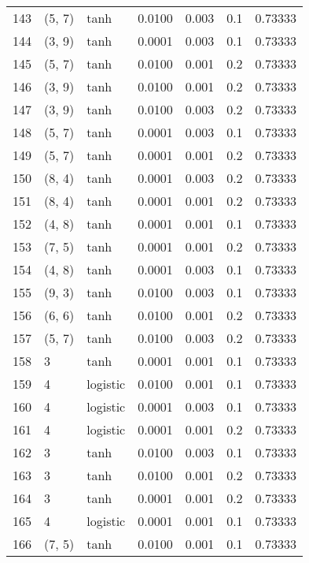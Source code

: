 \begin{tabular}{lllrrrr}
143 &      (5, 7) &      tanh &  0.0100 &  0.003 &  0.1 &   0.73333 \\
144 &      (3, 9) &      tanh &  0.0001 &  0.003 &  0.1 &   0.73333 \\
145 &      (5, 7) &      tanh &  0.0100 &  0.001 &  0.2 &   0.73333 \\
146 &      (3, 9) &      tanh &  0.0100 &  0.001 &  0.2 &   0.73333 \\
147 &      (3, 9) &      tanh &  0.0100 &  0.003 &  0.2 &   0.73333 \\
148 &      (5, 7) &      tanh &  0.0001 &  0.003 &  0.1 &   0.73333 \\
149 &      (5, 7) &      tanh &  0.0001 &  0.001 &  0.2 &   0.73333 \\
150 &      (8, 4) &      tanh &  0.0001 &  0.003 &  0.2 &   0.73333 \\
151 &      (8, 4) &      tanh &  0.0001 &  0.001 &  0.2 &   0.73333 \\
152 &      (4, 8) &      tanh &  0.0001 &  0.001 &  0.1 &   0.73333 \\
153 &      (7, 5) &      tanh &  0.0001 &  0.001 &  0.2 &   0.73333 \\
154 &      (4, 8) &      tanh &  0.0001 &  0.003 &  0.1 &   0.73333 \\
155 &      (9, 3) &      tanh &  0.0100 &  0.003 &  0.1 &   0.73333 \\
156 &      (6, 6) &      tanh &  0.0100 &  0.001 &  0.2 &   0.73333 \\
157 &      (5, 7) &      tanh &  0.0100 &  0.003 &  0.2 &   0.73333 \\
158 &           3 &      tanh &  0.0001 &  0.001 &  0.1 &   0.73333 \\
159 &           4 &  logistic &  0.0100 &  0.001 &  0.1 &   0.73333 \\
160 &           4 &  logistic &  0.0001 &  0.003 &  0.1 &   0.73333 \\
161 &           4 &  logistic &  0.0001 &  0.001 &  0.2 &   0.73333 \\
162 &           3 &      tanh &  0.0100 &  0.003 &  0.1 &   0.73333 \\
163 &           3 &      tanh &  0.0100 &  0.001 &  0.2 &   0.73333 \\
164 &           3 &      tanh &  0.0001 &  0.001 &  0.2 &   0.73333 \\
165 &           4 &  logistic &  0.0001 &  0.001 &  0.1 &   0.73333 \\
166 &      (7, 5) &      tanh &  0.0100 &  0.001 &  0.1 &   0.73333 \\

\end{tabular}
